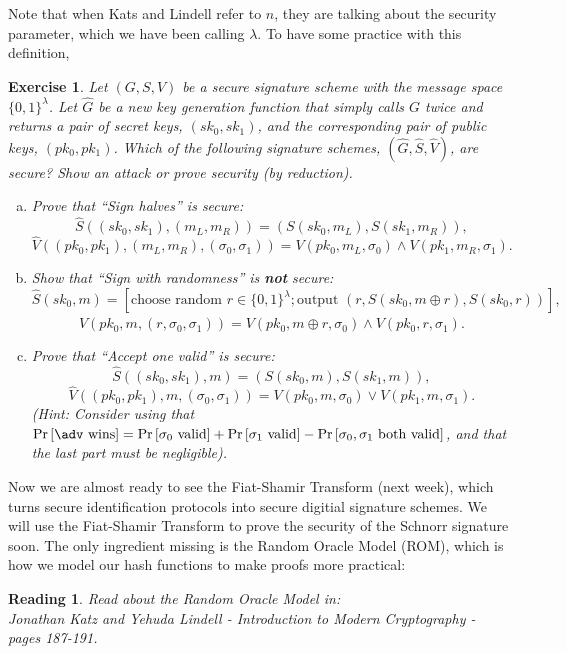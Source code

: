\documentclass[12pt]{article}
\newcommand{\pr}[1]{\text{Pr}\left[#1\right]}
\newtheorem{exercise}{Exercise}
\newtheorem{reading}{Reading}
\theoremstyle{definition}
\theoremstyle{remark}
\theoremstyle{definition}
\begin{document}
Note that when Kats and Lindell refer to $n$, they are talking about the security parameter, which we have been calling $\lambda$. To have some practice with this definition,

\begin{exercise}
Let $(G, S, V)$ be a secure signature scheme with the message space $\{0,1\}^\lambda$. Let $\hat{G}$ be a new key generation function that simply calls $G$ twice and returns a pair of secret keys, $(sk_0, sk_1)$, and the corresponding pair of public keys, $(pk_0, pk_1)$. Which of the following signature schemes, $(\hat{G}, \hat{S}, \hat{V})$, are secure? Show an attack or prove security (by reduction).
\begin{enumerate}[(a)]
\item Prove that ``Sign halves'' is secure: $$\hat{S}((sk_0, sk_1), (m_L, m_R)) = (S(sk_0, m_L), S(sk_1, m_R)),$$ $$\hat{V}((pk_0, pk_1), (m_L, m_R), (\sigma_0, \sigma_1)) = V(pk_0, m_L, \sigma_0)\wedge V(pk_1, m_R, \sigma_1).$$
\item Show that ``Sign with randomness'' is \textbf{not} secure: $$\hat{S}(sk_0, m) = [\text{choose random }r\in\{0,1\}^\lambda; \text{output }(r, S(sk_0, m\oplus r), S(sk_0, r))],$$ $$\hat{V}(pk_0, m, (r, \sigma_0, \sigma_1)) = V(pk_0, m\oplus r, \sigma_0)\wedge V(pk_0, r, \sigma_1).$$
\item Prove that ``Accept one valid'' is secure: $$\hat{S}((sk_0, sk_1), m) = (S(sk_0, m), S(sk_1, m)),$$ $$\hat{V}((pk_0, pk_1), m, (\sigma_0, \sigma_1)) = V(pk_0, m, \sigma_0)\vee V(pk_1, m, \sigma_1).$$ (Hint: Consider using that $\pr{\adv\text{ wins}} = \pr{\sigma_0\text{ valid}} + \pr{\sigma_1\text{ valid}} - \pr{\sigma_0,\sigma_1\text{ both valid}}$, and that the last part must be negligible).
\end{enumerate}
\end{exercise}

Now we are almost ready to see the Fiat-Shamir Transform (next week), which turns secure identification protocols into secure digitial signature schemes. We will use the Fiat-Shamir Transform to prove the security of the Schnorr signature soon. The only ingredient missing is the Random Oracle Model (ROM), which is how we model our hash functions to make proofs more practical:

\begin{reading}
Read about the Random Oracle Model in:\\
Jonathan Katz and Yehuda Lindell - Introduction to Modern Cryptography - pages 187-191.
\end{reading}
\end{document}
